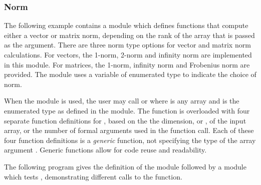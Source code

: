 \subsubsection{Norm}
The following example contains a module  which defines  
 functions that compute either a vector or matrix norm, depending
on the rank of the array that is passed as the argument.  There are three
norm type options for vector and matrix norm calculations.  For vectors,  
the 1-norm, 2-norm and infinity norm are implemented in this module.  
For matrices, the 1-norm, infinity norm and Frobenius norm are provided.   
The module uses a variable of enumerated type  to indicate the choice
of norm.

When the  module is used, the user may call 
 or  where
 is any array and  is the enumerated type as defined
in the  module.  The  function is overloaded with
four separate function definitions for , based on the
the dimension, or , of the input array, or the number of formal
arguments used in the  function call.  Each of these four function
definitions is a {\em generic} function, not specifying the type of the array
argument .  Generic functions allow for code reuse and readability.

The following program gives the definition of the  module followed
by a module which tests , demonstrating different calls to the 
function.

